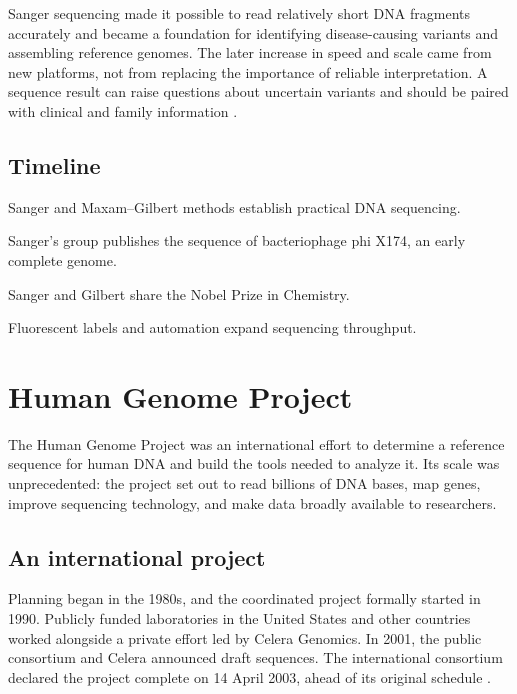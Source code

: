 \documentclass[12pt,oneside]{book}
\begin{document}
Sanger sequencing made it possible to read relatively short DNA fragments
accurately and became a foundation for identifying disease-causing variants
and assembling reference genomes. The later increase in speed and scale came
from new platforms, not from replacing the importance of reliable
interpretation. A sequence result can raise questions about uncertain variants
and should be paired with clinical and family information \cite{sangerNobel}.

\section*{Timeline}
\begin{description}[leftmargin=2.3cm,style=nextline]
  \item[1970s] Sanger and Maxam--Gilbert methods establish practical DNA sequencing.
  \item[1977] Sanger's group publishes the sequence of bacteriophage phi X174, an early complete genome.
  \item[1980] Sanger and Gilbert share the Nobel Prize in Chemistry.
  \item[1980s--1990s] Fluorescent labels and automation expand sequencing throughput.
\end{description}
\chapter[Human Genome Project]{Human Genome Project}

The Human Genome Project was an international effort to determine a
reference sequence for human DNA and build the tools needed to analyze it. Its
scale was unprecedented: the project set out to read billions of DNA bases,
map genes, improve sequencing technology, and make data broadly available to
researchers.

\section{An international project}
Planning began in the 1980s, and the coordinated project formally started in
1990. Publicly funded laboratories in the United States and other countries
worked alongside a private effort led by Celera Genomics. In 2001, the public
consortium and Celera announced draft sequences. The international consortium
declared the project complete on 14 April 2003, ahead of its original
schedule \cite{nhgriHGPCompletion,nhgriHGPTimeline}.
\end{document}
